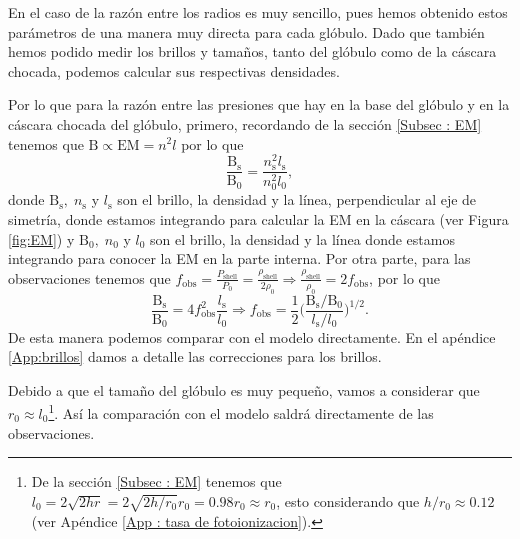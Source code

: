 \documentclass{book}
\begin{document}
En el caso de la razón entre los radios es muy sencillo, pues hemos
obtenido estos parámetros de una manera muy directa para cada glóbulo.
Dado que también hemos podido medir los brillos y tamaños, tanto del
glóbulo como de la cáscara chocada, podemos calcular sus respectivas
densidades.

Por lo que para la razón entre las presiones que hay en la base del
glóbulo y en la cáscara chocada del glóbulo, primero, recordando de la
sección \ref{Subsec : EM} tenemos que
$\mathrm{B}\propto \mathrm{EM}=n^2l$ por lo que
\begin{equation}
\frac{\mathrm{B_\mathrm{s}}}{\mathrm{B_0}}=\frac{n_\mathrm{s}^2l_\mathrm{s}}{n_0^2l_0},
\end{equation}
donde $\mathrm{B_\mathrm{s}}, \; n_\mathrm{s}$ y $l_\mathrm{s}$ son el
brillo, la densidad y la línea, perpendicular al eje de simetría,
donde estamos integrando para calcular la EM en la cáscara (ver Figura
\ref{fig:EM}) y $\mathrm{B_0}, \; n_0$ y $l_0$ son el brillo, la
densidad y la línea donde estamos integrando para conocer la EM en la
parte interna. Por otra parte, para las observaciones tenemos que
$f_\mathrm{obs} =
\frac{P_\mathrm{shell}}{P_0}=\frac{\rho_\mathrm{shell}}{2\rho_0} \Rightarrow
\frac{\rho_\mathrm{shell}}{\rho_0}=2f_\mathrm{obs}$, por lo que
\begin{equation}
\frac{\mathrm{B_\mathrm{s}}}{\mathrm{B_0}}=4f_\mathrm{obs}^2\frac{l_\mathrm{s}}{l_0}\Rightarrow f_\mathrm{obs}= \frac{1}{2}\Big(\frac{\mathrm{B_\mathrm{s}}/\mathrm{B_0}}{l_\mathrm{s}/l_0}\Big)^{1/2}.
\end{equation}
De esta manera podemos comparar con el modelo directamente. En el
apéndice \ref{App:brillos} damos a detalle las correcciones para los
brillos.

Debido a que el tamaño del glóbulo es muy pequeño, vamos a considerar
que $r_0\approx l_0$\footnote{De la sección \ref{Subsec : EM} tenemos que
  $l_0=2\sqrt{2hr}=2\sqrt{2h/r_0}r_0=0.98 r_0\approx r_0$, esto considerando
  que $h/r_0\approx0.12$ (ver Apéndice \ref{App : tasa de
    fotoionizacion}).}. Así la comparación con el modelo saldrá
directamente de las observaciones.
\end{document}

